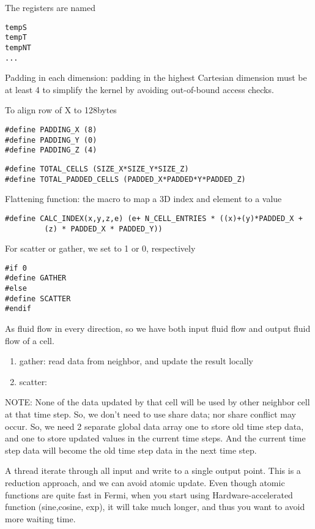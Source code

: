 The registers are named
\begin{verbatim}
tempS
tempT
tempNT
...
\end{verbatim}

Padding in each dimension: padding in the highest Cartesian dimension
must be at least 4 to simplify the kernel by avoiding out-of-bound
access checks. 

To align row of X to 128bytes
\begin{verbatim}
#define PADDING_X (8)
#define PADDING_Y (0)
#define PADDING_Z (4)
\end{verbatim}

\begin{verbatim}
#define TOTAL_CELLS (SIZE_X*SIZE_Y*SIZE_Z)
#define TOTAL_PADDED_CELLS (PADDED_X*PADDED*Y*PADDED_Z)
\end{verbatim}

Flattening function: the macro to map a 3D index and element to a
value 
\begin{verbatim}
#define CALC_INDEX(x,y,z,e) (e+ N_CELL_ENTRIES * ((x)+(y)*PADDED_X +
         (z) * PADDED_X * PADDED_Y))
\end{verbatim}

For scatter or gather, we set to 1 or 0, respectively
\begin{verbatim}
#if 0 
#define GATHER
#else
#define SCATTER
#endif
\end{verbatim}
As fluid flow in every direction, so we have both input fluid flow and
output fluid flow of a cell. 
\begin{enumerate}
\item gather: read data from neighbor, and update the result locally
\item scatter: 
\end{enumerate}
NOTE: None of the data updated by that cell will be used by other
neighbor cell at that time step. So, we don't need to use share data;
nor share conflict may occur. So, we need 2 separate global data array
one to store old time step data, and one to store updated values
in the current time steps. And the current time step data will become
the old time step data in the next time step. 


A thread iterate through all input and write to a single output
point. This is a reduction approach, and we can avoid atomic
update. Even though atomic functions are quite fast in Fermi, when you
start using Hardware-accelerated function (sine,cosine, exp), it will
take much longer, and thus you want to avoid more waiting time. 


